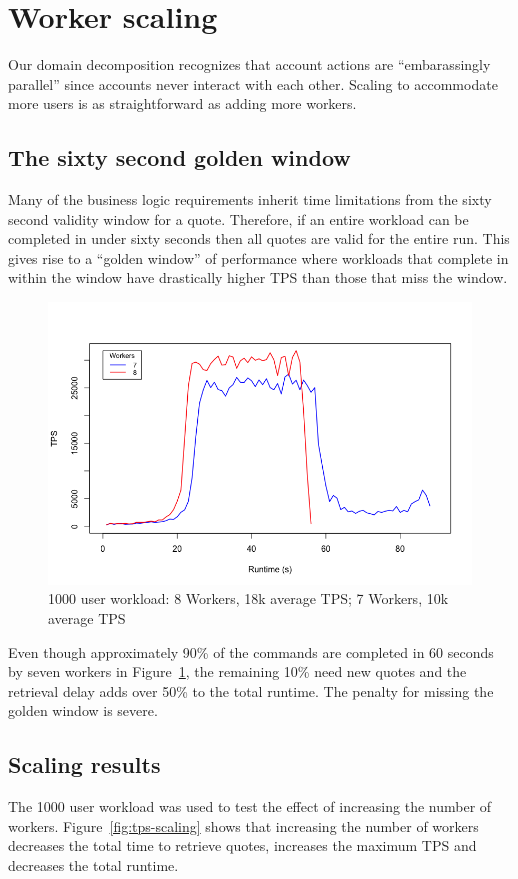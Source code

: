 \section{Worker scaling}\label{sec:scaling}
Our domain decomposition recognizes that account actions are ``embarassingly parallel'' since accounts never interact with each other.
Scaling to accommodate more users is as straightforward as adding more workers.

\subsection{The sixty second golden window}
Many of the business logic requirements inherit time limitations from the sixty second validity window for a quote.
Therefore, if an entire workload can be completed in under sixty seconds then all quotes are valid for the entire run.
This gives rise to a ``golden window'' of performance where workloads that complete in within the window have drastically higher TPS than those that miss the window.

\begin{figure}[tbph]
  \centering
  \includegraphics[width=0.7\linewidth]{../graphics/7v8}
  \caption[The golden window effect on TPS]{1000 user workload: 8 Workers, 18k average TPS; 7 Workers, 10k average TPS}
  \label{fig:tps-window}
\end{figure}

Even though approximately 90\% of the commands are completed in 60 seconds by seven workers in Figure~\ref{fig:tps-window}, the remaining 10\% need new quotes and the retrieval delay adds over 50\% to the total runtime.
The penalty for missing the golden window is severe.

\subsection{Scaling results}\label{sec:worker-scaling-results}
The 1000 user workload was used to test the effect of increasing the number of workers.
Figure~\ref{fig:tps-scaling} shows that increasing the number of workers decreases the total time to retrieve quotes, increases the maximum TPS and decreases the total runtime.

